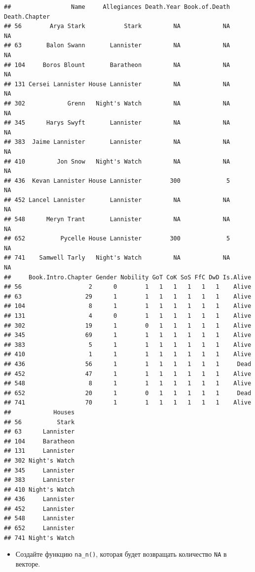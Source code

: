 \documentclass[]{book}
\providecommand{\tightlist}{%
  \setlength{\itemsep}{0pt}\setlength{\parskip}{0pt}}
\begin{document}
\begin{verbatim}
##                 Name     Allegiances Death.Year Book.of.Death Death.Chapter
## 56        Arya Stark           Stark         NA            NA            NA
## 63       Balon Swann       Lannister         NA            NA            NA
## 104     Boros Blount       Baratheon         NA            NA            NA
## 131 Cersei Lannister House Lannister         NA            NA            NA
## 302            Grenn   Night's Watch         NA            NA            NA
## 345      Harys Swyft       Lannister         NA            NA            NA
## 383  Jaime Lannister       Lannister         NA            NA            NA
## 410         Jon Snow   Night's Watch         NA            NA            NA
## 436  Kevan Lannister House Lannister        300             5            NA
## 452 Lancel Lannister       Lannister         NA            NA            NA
## 548      Meryn Trant       Lannister         NA            NA            NA
## 652          Pycelle House Lannister        300             5            NA
## 741    Samwell Tarly   Night's Watch         NA            NA            NA
##     Book.Intro.Chapter Gender Nobility GoT CoK SoS FfC DwD Is.Alive
## 56                   2      0        1   1   1   1   1   1    Alive
## 63                  29      1        1   1   1   1   1   1    Alive
## 104                  8      1        1   1   1   1   1   1    Alive
## 131                  4      0        1   1   1   1   1   1    Alive
## 302                 19      1        0   1   1   1   1   1    Alive
## 345                 69      1        1   1   1   1   1   1    Alive
## 383                  5      1        1   1   1   1   1   1    Alive
## 410                  1      1        1   1   1   1   1   1    Alive
## 436                 56      1        1   1   1   1   1   1     Dead
## 452                 47      1        1   1   1   1   1   1    Alive
## 548                  8      1        1   1   1   1   1   1    Alive
## 652                 20      1        0   1   1   1   1   1     Dead
## 741                 70      1        1   1   1   1   1   1    Alive
##            Houses
## 56          Stark
## 63      Lannister
## 104     Baratheon
## 131     Lannister
## 302 Night's Watch
## 345     Lannister
## 383     Lannister
## 410 Night's Watch
## 436     Lannister
## 452     Lannister
## 548     Lannister
## 652     Lannister
## 741 Night's Watch
\end{verbatim}

\begin{itemize}
\tightlist
\item
  Создайте функцию \texttt{na\_n()}, которая будет возвращать количество
  \texttt{NA} в векторе.
\end{itemize}
\end{document}
